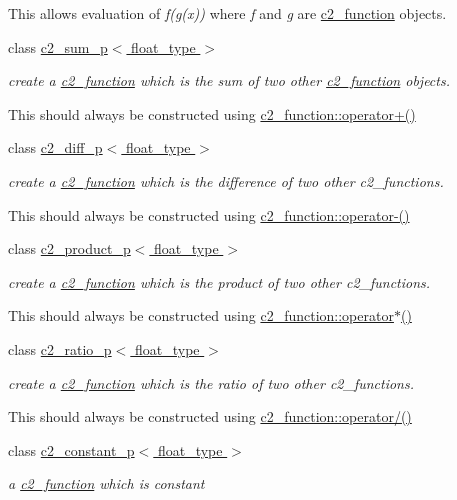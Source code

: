 \begin{DoxyCompactItemize}
\begin{DoxyCompactList}
This allows evaluation of {\itshape f(g(x))} where {\itshape f} and {\itshape g} are \hyperlink{classc2__function}{c2\+\_\+function} objects. \end{DoxyCompactList}\item 
class \hyperlink{classc2__sum__p}{c2\+\_\+sum\+\_\+p$<$ float\+\_\+type $>$}
\begin{DoxyCompactList}\small\item\em create a \hyperlink{classc2__function}{c2\+\_\+function} which is the sum of two other \hyperlink{classc2__function}{c2\+\_\+function} objects.

This should always be constructed using \hyperlink{classc2__function_a268b206b47c55e635e5f0a9e0f3e8ded}{c2\+\_\+function\+::operator+()} \end{DoxyCompactList}\item 
class \hyperlink{classc2__diff__p}{c2\+\_\+diff\+\_\+p$<$ float\+\_\+type $>$}
\begin{DoxyCompactList}\small\item\em create a \hyperlink{classc2__function}{c2\+\_\+function} which is the difference of two other c2\+\_\+functions.

This should always be constructed using \hyperlink{classc2__function_a4c56a4673e00bfad37143c403a0c94c8}{c2\+\_\+function\+::operator-\/()} \end{DoxyCompactList}\item 
class \hyperlink{classc2__product__p}{c2\+\_\+product\+\_\+p$<$ float\+\_\+type $>$}
\begin{DoxyCompactList}\small\item\em create a \hyperlink{classc2__function}{c2\+\_\+function} which is the product of two other c2\+\_\+functions.

This should always be constructed using \hyperlink{classc2__function_a7744675c98a8ec63320ac1c0b61bec9c}{c2\+\_\+function\+::operator$\ast$()} \end{DoxyCompactList}\item 
class \hyperlink{classc2__ratio__p}{c2\+\_\+ratio\+\_\+p$<$ float\+\_\+type $>$}
\begin{DoxyCompactList}\small\item\em create a \hyperlink{classc2__function}{c2\+\_\+function} which is the ratio of two other c2\+\_\+functions.

This should always be constructed using \hyperlink{classc2__function_a93ac28dfe5daebea84d147b8e346e60c}{c2\+\_\+function\+::operator/()} \end{DoxyCompactList}\item 
class \hyperlink{classc2__constant__p}{c2\+\_\+constant\+\_\+p$<$ float\+\_\+type $>$}
\begin{DoxyCompactList}\small\item\em a \hyperlink{classc2__function}{c2\+\_\+function} which is constant


\end{DoxyCompactList}
\end{DoxyCompactItemize}
